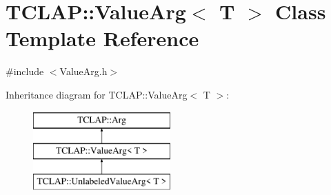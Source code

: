 \hypertarget{class_t_c_l_a_p_1_1_value_arg}{}\section{T\+C\+L\+A\+P\+:\+:Value\+Arg$<$ T $>$ Class Template Reference}
\label{class_t_c_l_a_p_1_1_value_arg}


{\ttfamily \#include $<$Value\+Arg.\+h$>$}

Inheritance diagram for T\+C\+L\+A\+P\+:\+:Value\+Arg$<$ T $>$\+:\begin{figure}[H]
\begin{center}
\leavevmode
\includegraphics[height=3.000000cm]{class_t_c_l_a_p_1_1_value_arg}
\end{center}
\end{figure}
